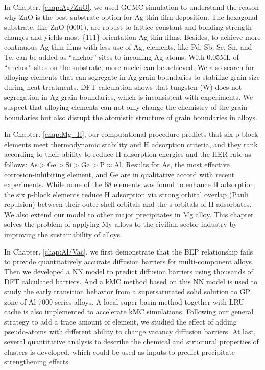 In Chapter. \ref{chap:Ag/ZnO}, we used \ac{GCMC} simulation to understand the reason why ZnO is the best substrate option for Ag thin film deposition. The hexagonal substrate, like ZnO (000$\overline{1}$), are robust to lattice constant and bonding strength changes and yields most \{111\} orientation Ag thin films. Besides, to achieve more continuous Ag thin films with less use of Ag, elements, like Pd, Sb, Se, Sn, and Te, can be added as ``anchor'' sites to incoming Ag atoms. With 0.05\ac{ML} of ``anchor'' sites on the substrate, more nuclei can be achieved. We also search for alloying elements that can segregate in Ag grain boundaries to stabilize grain size during heat treatments. \ac{DFT} calculation shows that tungsten (W) does not segregation in Ag grain boundaries, which is inconsistent with experiments. We suspect that alloying elements can not only change the chemistry of the grain boundaries but also disrupt the atomistic structure of grain boundaries in alloys.

In Chapter. \ref{chap:Mg_H}, our computational procedure predicts that six p-block elements meet thermodynamic stability and H adsorption criteria, and they rank according to their ability to reduce H adsorption energies and the \ac{HER} rate as follows: $\text{As} > \text{Ge} > \text{Si} > \text{Ga} > \text{P} \approx \text{Al}$. Results for As, the most effective corrosion-inhibiting element, and Ge are in qualitative accord with recent experiments. While none of the 68 elements was found to enhance H adsorption, the six p-block elements reduce H adsorption via strong orbital overlap (Pauli repulsion) between their outer-shell orbitals and the s orbitals of H adsorbates. We also extend our model to other major precipitates in Mg alloy. This chapter solves the problem of applying My alloys to the civilian-sector industry by improving the sustainability of alloys.

In Chapter. \ref{chap:Al/Vac}, we first demonstrate that the \acf{BEP} relationship fails to provide quantitatively accurate diffusion barriers for multi-component alloys. Then we developed a \ac{NN} model to predict diffusion barriers using thousands of \ac{DFT} calculated barriers. And a \ac{kMC} method based on this \ac{NN} model is used to study the early transition behavior from a supersaturated solid solution to \ac{GP} zone of Al 7000 series alloys. A local super-basin method together with \ac{LRU} cache is also implemented to accelerate \ac{kMC} simulations. Following our general strategy to add a trace amount of element, we studied the effect of adding pseudo-atoms with different ability to change vacancy diffusion barriers. At last, several quantitative analysis to describe the chemical and structural properties of clusters is developed, which could be used as inputs to predict precipitate strengthening effects.


